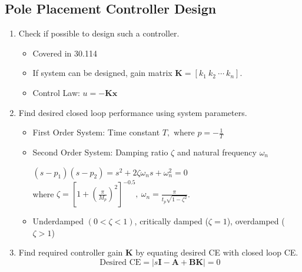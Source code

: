 \documentclass[a4paper]{article}
\begin{document}
\subsection{Pole Placement Controller Design}
\begin{enumerate}
    \item Check if possible to design such a controller.
    \begin{itemize}[label=$\circ$]
        \item Covered in 30.114
        \item If system can be designed, gain matrix $\mathbf{K} = [k_1\ k_2\ \cdots\ k_n]$.
        \item Control Law: $u= -\mathbf{Kx}$
    \end{itemize}
    \item Find desired closed loop performance using system parameters.
    \begin{itemize}[label=$\circ$]
        \item First Order System: Time constant $T, \text{ where } p=-\displaystyle\frac{1}{T}$ 
        \item Second Order System: Damping ratio $\zeta$ and natural frequency $\omega_n$
        \begin{center}
            $(s-p_1)(s-p_2) = s^2+2\zeta\omega_n s+\omega_n^2 = 0$\vspace{0.2cm}\\
            where $\zeta = \left[1+\left(\displaystyle\frac{\pi}{M_p}\right)^2\right]^{-0.5},\ \omega_n = \displaystyle\frac{\pi}{t_p\sqrt{1-\zeta^2}}$.
        \end{center}
       
        \item Underdamped $(0<\zeta<1)$, critically damped ($\zeta = 1$), overdamped ($\zeta>1$)
    \end{itemize}
    \item Find required controller gain $\mathbf{K}$ by equating desired CE with closed loop CE.
    $$\text{Desired CE} = |s\mathbf{I}-\mathbf{A}+\mathbf{BK}|=0$$
\end{enumerate}

\newpage
\end{document}

